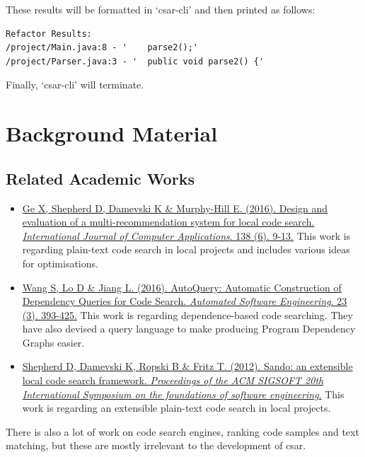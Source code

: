 \documentclass[12pt, letterpaper]{article}
\begin{document}
These results will be formatted in `csar-cli' and then printed as follows:
\begin{lstlisting}
Refactor Results:
/project/Main.java:8 - '    parse2();'
/project/Parser.java:3 - '  public void parse2() {'
\end{lstlisting}

Finally, `csar-cli' will terminate.

\section{Background Material}
\subsection{Related Academic Works}
\begin{itemize}
    \item \href{http://www.sciencedirect.com.ezproxy.library.qmul.ac.uk/science/article/pii/S1045926X16300970?_rdoc=1&_fmt=high&_origin=gateway&_docanchor=&md5=b8429449ccfc9c30159a5f9aeaa92ffb&ccp=y}{Ge X, Shepherd D, Damevski K \& Murphy-Hill E. (2016). Design and evaluation of a multi-recommendation system for local code search. \textit{International Journal of Computer Applications}. 138 (6). 9-13.}\newline
    This work is regarding plain-text code search in local projects and includes various ideas for optimisations.
    \item \href{https://link-springer-com.ezproxy.library.qmul.ac.uk/article/10.1007%2Fs10515-014-0170-2}{Wang S, Lo D \& Jiang L. (2016). AutoQuery: Automatic Construction of Dependency Queries for Code Search. \textit{Automated Software Engineering}. 23 (3). 393-425.}\newline
    This work is regarding dependence-based code searching.
    They have also devised a query language to make producing Program Dependency Graphs easier.
    \item \href{http://dl.acm.org.ezproxy.library.qmul.ac.uk/citation.cfm?id=2393612}{Shepherd D, Damevski K, Ropski B \& Fritz T. (2012). Sando: an extensible local code search framework. \textit{Proceedings of the ACM SIGSOFT 20th International Symposium on the foundations of software engineering}.}\newline
    This work is regarding an extensible plain-text code search in local projects.
\end{itemize}

There is also a lot of work on code search engines, ranking code samples and text matching, but these are mostly irrelevant to the development of csar.
\end{document}
